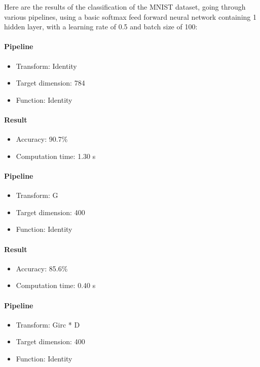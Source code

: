 \documentclass[11pt,a4paper]{article}
\begin{document}
	
	Here are the results of the classification of the MNIST dataset, going through various pipelines, using a basic softmax feed forward neural network containing 1 hidden layer, with a learning rate of 0.5 and batch size of 100:
	

	
	\paragraph{Pipeline}
	\begin{itemize}
			\item Transform: Identity
			\item Target dimension: 784
			\item Function: Identity
	\end{itemize}
	 \paragraph{Result}
	 \begin{itemize}
			\item Accuracy: 90.7\%
			\item Computation time: 1.30 s
	\end{itemize}



	\paragraph{Pipeline}
	\begin{itemize}
		\item Transform: G
		\item Target dimension: 400
		\item Function: Identity
	\end{itemize}
	\paragraph{Result}
	\begin{itemize}
		\item Accuracy: 85.6\%
		\item Computation time: 0.40 s
	\end{itemize}
	
	
		\paragraph{Pipeline}
		\begin{itemize}
			\item Transform: Girc * D
			\item Target dimension: 400
			\item Function: Identity
		\end{itemize}
\end{document}
